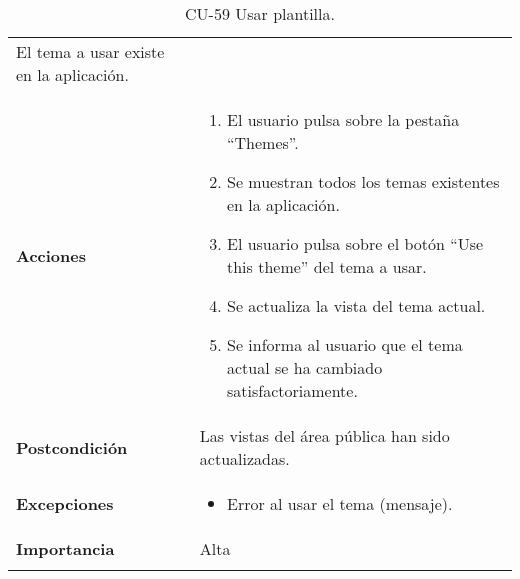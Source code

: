 \begin{longtable}[]{@{}ll@{}}
\begin{minipage}[t]{0.71\columnwidth}
El tema a usar existe en la aplicación.\strut
\end{minipage}\tabularnewline
\begin{minipage}[t]{0.23\columnwidth}\raggedright
\textbf{Acciones}\strut
\end{minipage} & \begin{minipage}[t]{0.71\columnwidth}\raggedright
\begin{enumerate}
\def\labelenumi{\arabic{enumi}.}
\tightlist
\item
  El usuario pulsa sobre la pestaña ``Themes''.
\item
  Se muestran todos los temas existentes en la aplicación.
\item
  El usuario pulsa sobre el botón ``Use this theme'' del tema a usar.
\item
  Se actualiza la vista del tema actual.
\item
  Se informa al usuario que el tema actual se ha cambiado
  satisfactoriamente.
\end{enumerate}\strut
\end{minipage}\tabularnewline
\begin{minipage}[t]{0.23\columnwidth}\raggedright
\textbf{Postcondición}\strut
\end{minipage} & \begin{minipage}[t]{0.71\columnwidth}\raggedright
Las vistas del área pública han sido actualizadas.\strut
\end{minipage}\tabularnewline
\begin{minipage}[t]{0.23\columnwidth}\raggedright
\textbf{Excepciones}\strut
\end{minipage} & \begin{minipage}[t]{0.71\columnwidth}\raggedright
\begin{itemize}
\tightlist
\item
  Error al usar el tema (mensaje).
\end{itemize}\strut
\end{minipage}\tabularnewline
\begin{minipage}[t]{0.23\columnwidth}\raggedright
\textbf{Importancia}\strut
\end{minipage} & \begin{minipage}[t]{0.71\columnwidth}\raggedright
Alta\strut
\end{minipage}\tabularnewline
\bottomrule
\caption{CU-59 Usar plantilla.}
\end{longtable}


